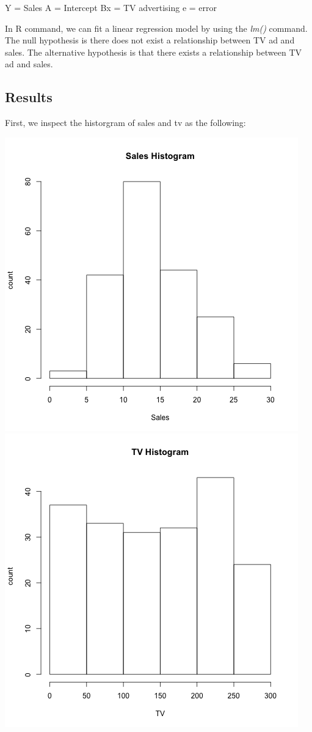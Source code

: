 \documentclass[]{article}
\begin{document}
Y = Sales A = Intercept Bx = TV advertising e = error

In R command, we can fit a linear regression model by using the
\emph{lm()} command. The null hypothesis is there does not exist a
relationship between TV ad and sales. The alternative hypothesis is that
there exists a relationship between TV ad and sales.

\subsection{Results}\label{results}

First, we inspect the historgram of sales and tv as the following:

\includegraphics{./images/histogram-sales.png}
\includegraphics{./images/histogram-tv.png}
\end{document}
